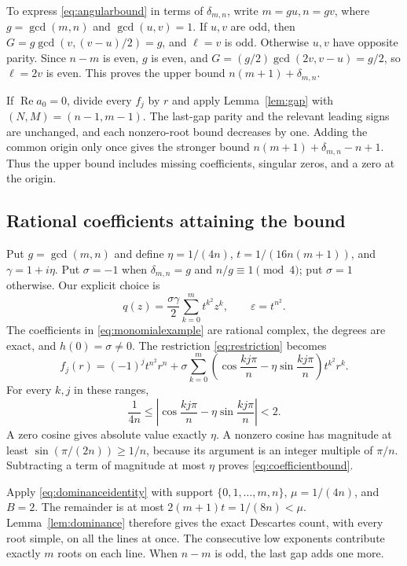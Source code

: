 \documentclass[a4paper]{amsart}
\theoremstyle{remark}
\newcommand{\eps}{\varepsilon}
\DeclareMathOperator{\Rea}{Re}
\begin{document}
To express \eqref{eq:angularbound} in terms of
\(\delta_{m,n}\), write \(m=gu,n=gv\), where
\(g=\gcd(m,n)\) and \(\gcd(u,v)=1\).
If \(u,v\) are odd, then
\(G=g\gcd(v,(v-u)/2)=g\), and \(\ell=v\) is odd.
Otherwise \(u,v\) have opposite parity. Since \(n-m\)
is even, \(g\) is even, and
\(G=(g/2)\gcd(2v,v-u)=g/2\), so \(\ell=2v\)
is even. This proves the upper bound
\(n(m+1)+\delta_{m,n}\).

If \(\Rea a_0=0\), divide every \(f_j\) by \(r\)
and apply Lemma~\ref{lem:gap} with
\((N,M)=(n-1,m-1)\).
The last-gap parity and the relevant leading signs
are unchanged, and each nonzero-root bound decreases
by one. Adding the common origin only once gives
the stronger bound \(n(m+1)+\delta_{m,n}-n+1\).
Thus the upper bound includes missing coefficients,
singular zeros, and a zero at the origin.

\subsection{Rational coefficients attaining the bound}
Put \(g=\gcd(m,n)\) and define
\(\eta=1/(4n)\), \(t=1/(16n(m+1))\), and
\(\gamma=1+i\eta\). Put \(\sigma=-1\) when
\(\delta_{m,n}=g\) and \(n/g\equiv1\pmod4\);
put \(\sigma=1\) otherwise.
Our explicit choice is
\begin{equation}\label{eq:monomialexample}
 q(z)=\frac{\sigma\gamma}{2}\sum_{k=0}^m t^{k^2}z^k,
 \qquad \eps=t^{n^2}.
\end{equation}
The coefficients in \eqref{eq:monomialexample} are rational complex, the degrees
are exact, and \(h(0)=\sigma\ne0\).
The restriction \eqref{eq:restriction} becomes
\[
 f_j(r)=(-1)^jt^{n^2}r^n+
 \sigma\sum_{k=0}^m
 \left(\cos\frac{kj\pi}{n}-\eta\sin\frac{kj\pi}{n}\right)
 t^{k^2}r^k.
\]
For every \(k,j\) in these ranges,
\begin{equation}\label{eq:coefficientbound}
 \frac1{4n}\le
 \left|\cos\frac{kj\pi}{n}-\eta\sin\frac{kj\pi}{n}\right|<2.
\end{equation}
A zero cosine gives absolute value exactly \(\eta\).
A nonzero cosine has magnitude at least
\(\sin(\pi/(2n))\ge1/n\), because its argument is an
integer multiple of \(\pi/n\).
Subtracting a term of magnitude at most \(\eta\)
proves \eqref{eq:coefficientbound}.

Apply \eqref{eq:dominanceidentity} with support
\(\{0,1,\ldots,m,n\}\), \(\mu=1/(4n)\), and \(B=2\).
The remainder is at most \(2(m+1)t=1/(8n)<\mu\).
Lemma~\ref{lem:dominance} therefore gives the exact
Descartes count, with every root simple, on all
the lines at once.
The consecutive low exponents contribute exactly
\(m\) roots on each line. When \(n-m\) is odd,
the last gap adds one more.
\end{document}
